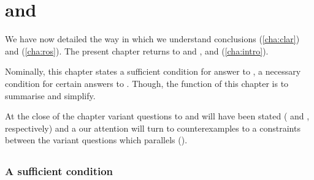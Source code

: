 \chapter{\qWhyV{} and \qHowV{}}
\label{cha:var}


\begin{note}
  We have now detailed the way in which we understand conclusions (\autoref{cha:clar}) and \ros{} (\autoref{cha:ros}).
  The present chapter returns to \qWhy{} and \qHow{}, and \issueInclusion{} (\autoref{cha:intro}).

  Nominally, this chapter states a sufficient condition for answer to \qWhy{}, a necessary condition for certain answers to \qHow{}.
  Though, the function of this chapter is to summarise and simplify.

  At the close of the chapter variant questions to \qWhy{} and \qHow{} will have been stated (\qWhyV{} and \qHowV{}, respectively) and a our attention will turn to counterexamples to a constraints between the variant questions which parallels \issueInclusion{} (\issueInclusion{}).
\end{note}

\section{\qWhyV{}}
\label{cha:var:qwhyvnp}


\subsection{A sufficient condition}
\label{sec:sufficient-condition}

